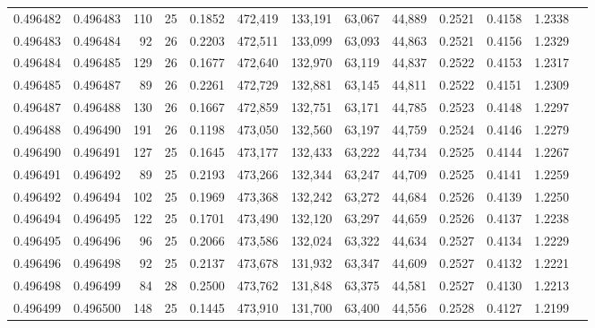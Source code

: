 \begin{tabular}{rrrrrrrrrrrrr}
0.496482 & 0.496483 & 110 &  25 &                                     0.1852 & 472,419 & 133,191 &  63,067 &  44,889 & 0.2521 & 0.4158 & 1.2338 \\
0.496483 & 0.496484 &  92 &  26 &                                     0.2203 & 472,511 & 133,099 &  63,093 &  44,863 & 0.2521 & 0.4156 & 1.2329 \\
0.496484 & 0.496485 & 129 &  26 &                                     0.1677 & 472,640 & 132,970 &  63,119 &  44,837 & 0.2522 & 0.4153 & 1.2317 \\
0.496485 & 0.496487 &  89 &  26 &                                     0.2261 & 472,729 & 132,881 &  63,145 &  44,811 & 0.2522 & 0.4151 & 1.2309 \\
0.496487 & 0.496488 & 130 &  26 &                                     0.1667 & 472,859 & 132,751 &  63,171 &  44,785 & 0.2523 & 0.4148 & 1.2297 \\
0.496488 & 0.496490 & 191 &  26 &                                     0.1198 & 473,050 & 132,560 &  63,197 &  44,759 & 0.2524 & 0.4146 & 1.2279 \\
0.496490 & 0.496491 & 127 &  25 &                                     0.1645 & 473,177 & 132,433 &  63,222 &  44,734 & 0.2525 & 0.4144 & 1.2267 \\
0.496491 & 0.496492 &  89 &  25 &                                     0.2193 & 473,266 & 132,344 &  63,247 &  44,709 & 0.2525 & 0.4141 & 1.2259 \\
0.496492 & 0.496494 & 102 &  25 &                                     0.1969 & 473,368 & 132,242 &  63,272 &  44,684 & 0.2526 & 0.4139 & 1.2250 \\
0.496494 & 0.496495 & 122 &  25 &                                     0.1701 & 473,490 & 132,120 &  63,297 &  44,659 & 0.2526 & 0.4137 & 1.2238 \\
0.496495 & 0.496496 &  96 &  25 &                                     0.2066 & 473,586 & 132,024 &  63,322 &  44,634 & 0.2527 & 0.4134 & 1.2229 \\
0.496496 & 0.496498 &  92 &  25 &                                     0.2137 & 473,678 & 131,932 &  63,347 &  44,609 & 0.2527 & 0.4132 & 1.2221 \\
0.496498 & 0.496499 &  84 &  28 &                                     0.2500 & 473,762 & 131,848 &  63,375 &  44,581 & 0.2527 & 0.4130 & 1.2213 \\
0.496499 & 0.496500 & 148 &  25 &                                     0.1445 & 473,910 & 131,700 &  63,400 &  44,556 & 0.2528 & 0.4127 & 1.2199 \\

\end{tabular}
